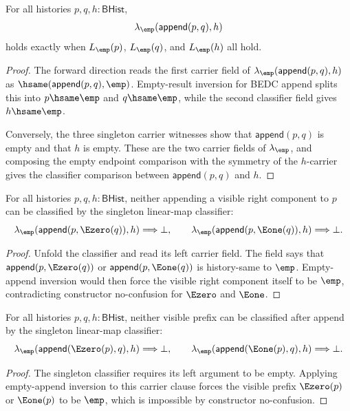 \begin{theorem}
\label{thm:linearmap-singleton-classifier-append-split-empty}
For all histories $p,q,h:\mathsf{BHist}$,
$$
\lambda_{\emp}(\mathsf{append}(p,q),h)
$$
holds exactly when $L_{\emp}(p)$, $L_{\emp}(q)$, and $L_{\emp}(h)$ all hold.
\end{theorem}
\begin{proof}
The forward direction reads the first carrier field of
$\lambda_{\emp}(\mathsf{append}(p,q),h)$ as
$\hsame(\mathsf{append}(p,q),\emp)$. Empty-result inversion for BEDC append
splits this into $p\hsame\emp$ and $q\hsame\emp$, while the second classifier
field gives $h\hsame\emp$.

Conversely, the three singleton carrier witnesses show that
$\mathsf{append}(p,q)$ is empty and that $h$ is empty. These are the two
carrier fields of $\lambda_{\emp}$, and composing the empty endpoint
comparison with the symmetry of the $h$-carrier gives the classifier
comparison between $\mathsf{append}(p,q)$ and $h$.
\end{proof}

\begin{theorem}
\label{thm:linearmap-singleton-classifier-append-visible-left-absurd}
For all histories $p,q,h:\mathsf{BHist}$, neither appending a visible right
component to $p$ can be classified by the singleton linear-map classifier:
$$
\lambda_{\emp}(\mathsf{append}(p,\Ezero(q)),h)\Longrightarrow\bot,
\qquad
\lambda_{\emp}(\mathsf{append}(p,\Eone(q)),h)\Longrightarrow\bot.
$$
\end{theorem}
\begin{proof}
Unfold the classifier and read its left carrier field. The field says that
$\mathsf{append}(p,\Ezero(q))$ or $\mathsf{append}(p,\Eone(q))$ is
history-same to $\emp$. Empty-append inversion would then force the visible
right component itself to be $\emp$, contradicting constructor no-confusion
for $\Ezero$ and $\Eone$.
\end{proof}

\begin{theorem}
\label{thm:linearmap-singleton-classifier-append-visible-prefix-absurd}
For all histories $p,q,h:\mathsf{BHist}$, neither visible prefix can be
classified after append by the singleton linear-map classifier:
$$
\lambda_{\emp}(\mathsf{append}(\Ezero(p),q),h)\Longrightarrow\bot,
\qquad
\lambda_{\emp}(\mathsf{append}(\Eone(p),q),h)\Longrightarrow\bot.
$$
\end{theorem}
\begin{proof}
The singleton classifier requires its left argument to be empty. Applying
empty-append inversion to this carrier clause forces the visible prefix
$\Ezero(p)$ or $\Eone(p)$ to be $\emp$, which is impossible by constructor
no-confusion.
\end{proof}

